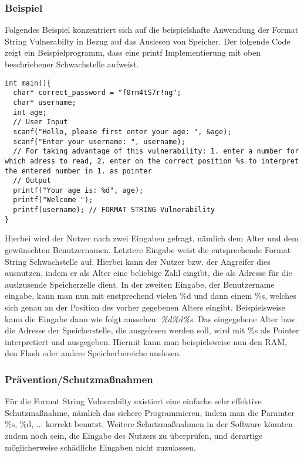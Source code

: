 \documentclass[a4paper,
DIV=13,
12pt,
BCOR=10mm,
department=FakIM,
oneside,
parskip=half,
automark,
listof=totocnumbered,
bibliography=totocnumbered,
acronym=totocnumbered
] {OTHRartcl}
\begin{document}
\subsubsection{Beispiel}
Folgendes Beispiel konzentriert sich auf die beispielshafte Anwendung der Format String Vulnerabilty in Bezug auf das Auslesen von Speicher.
Der folgende Code zeigt ein Beispielprogramm, dass eine printf Implementierung mit oben beschriebener Schwachstelle aufweist.
\begin{verbatim}
int main(){
  char* correct_password = "f0rm4tS7r!ng";
  char* username;
  int age;
  // User Input
  scanf("Hello, please first enter your age: ", &age);
  scanf("Enter your username: ", username);
  // For taking advantage of this vulnerability: 1. enter a number for which adress to read, 2. enter on the correct position %s to interpret the entered number in 1. as pointer
  // Output
  printf("Your age is: %d", age);
  printf("Welcome ");
  printf(username); // FORMAT STRING Vulnerability
}
\end{verbatim}
Hierbei wird der Nutzer nach zwei Eingaben gefragt, nämlich dem Alter und dem gewünschten Benutzernamen.
Letztere Eingabe weist die entsprechende Format String Schwachstelle auf.
Hierbei kann der Nutzer bzw. der Angreifer dies ausnutzen, indem er als Alter eine beliebige Zahl eingibt, die als Adresse für die auslzusende Speicherzelle dient.
In der zweiten Eingabe, der Benutzername eingabe, kann man nun mit enstprechend vielen \%d und dann einem \%s, welches sich genau an der Position des
vorher gegebenen Alters eingibt. Beispielsweise kann die Eingabe dann wie folgt aussehen: \textit{\%d\%d\%s}.
Das eingegebene Alter bzw. die Adresse der Speicherstelle, die ausgelesen werden soll, wird mit \%s als Pointer interpretiert und ausgegeben.
Hiermit kann man beispielsweise nun den RAM, den Flash oder andere Speicherbereiche auslesen.

\subsubsection{Prävention/Schutzmaßnahmen}
Für die Format String Vulnerabilty existiert eine einfache sehr effektive Schutzmaßnahme, nämlich
das sichere Programmieren, indem man die Paramter \%s, \%d, ... korrekt benutzt.
Weitere Schutzmaßnahmen in der Software könnten zudem noch sein, die Eingabe des Nutzers zu überprüfen, und
derartige möglicherweise schädliche Eingaben nicht zuzulassen.
\end{document}
